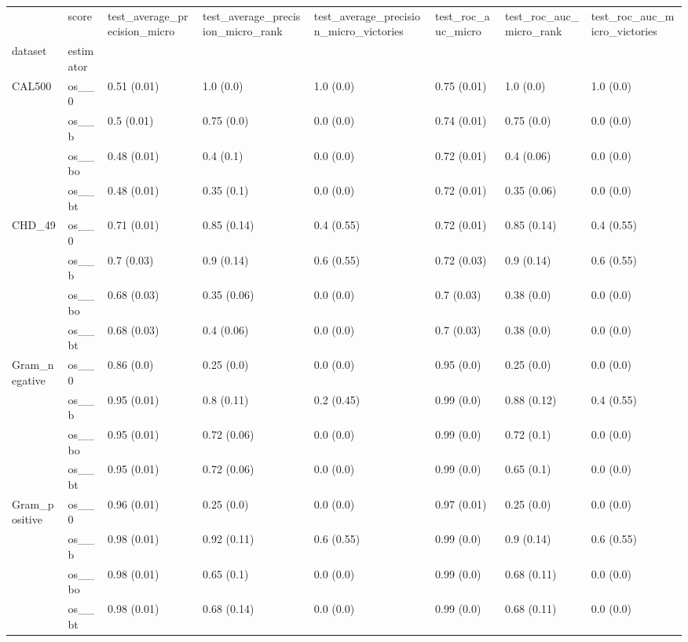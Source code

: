 \begin{tabular}{llllllll}
\toprule
 & score & test_average_precision_micro & test_average_precision_micro_rank & test_average_precision_micro_victories & test_roc_auc_micro & test_roc_auc_micro_rank & test_roc_auc_micro_victories \\
dataset & estimator &  &  &  &  &  &  \\
\midrule
\multirow[t]{4}{*}{CAL500} & os__0 & 0.51 (0.01) & 1.0 (0.0) & 1.0 (0.0) & 0.75 (0.01) & 1.0 (0.0) & 1.0 (0.0) \\
 & os__b & 0.5 (0.01) & 0.75 (0.0) & 0.0 (0.0) & 0.74 (0.01) & 0.75 (0.0) & 0.0 (0.0) \\
 & os__bo & 0.48 (0.01) & 0.4 (0.1) & 0.0 (0.0) & 0.72 (0.01) & 0.4 (0.06) & 0.0 (0.0) \\
 & os__bt & 0.48 (0.01) & 0.35 (0.1) & 0.0 (0.0) & 0.72 (0.01) & 0.35 (0.06) & 0.0 (0.0) \\
\cline{1-8}
\multirow[t]{4}{*}{CHD_49} & os__0 & 0.71 (0.01) & 0.85 (0.14) & 0.4 (0.55) & 0.72 (0.01) & 0.85 (0.14) & 0.4 (0.55) \\
 & os__b & 0.7 (0.03) & 0.9 (0.14) & 0.6 (0.55) & 0.72 (0.03) & 0.9 (0.14) & 0.6 (0.55) \\
 & os__bo & 0.68 (0.03) & 0.35 (0.06) & 0.0 (0.0) & 0.7 (0.03) & 0.38 (0.0) & 0.0 (0.0) \\
 & os__bt & 0.68 (0.03) & 0.4 (0.06) & 0.0 (0.0) & 0.7 (0.03) & 0.38 (0.0) & 0.0 (0.0) \\
\cline{1-8}
\multirow[t]{4}{*}{Gram_negative} & os__0 & 0.86 (0.0) & 0.25 (0.0) & 0.0 (0.0) & 0.95 (0.0) & 0.25 (0.0) & 0.0 (0.0) \\
 & os__b & 0.95 (0.01) & 0.8 (0.11) & 0.2 (0.45) & 0.99 (0.0) & 0.88 (0.12) & 0.4 (0.55) \\
 & os__bo & 0.95 (0.01) & 0.72 (0.06) & 0.0 (0.0) & 0.99 (0.0) & 0.72 (0.1) & 0.0 (0.0) \\
 & os__bt & 0.95 (0.01) & 0.72 (0.06) & 0.0 (0.0) & 0.99 (0.0) & 0.65 (0.1) & 0.0 (0.0) \\
\cline{1-8}
\multirow[t]{4}{*}{Gram_positive} & os__0 & 0.96 (0.01) & 0.25 (0.0) & 0.0 (0.0) & 0.97 (0.01) & 0.25 (0.0) & 0.0 (0.0) \\
 & os__b & 0.98 (0.01) & 0.92 (0.11) & 0.6 (0.55) & 0.99 (0.0) & 0.9 (0.14) & 0.6 (0.55) \\
 & os__bo & 0.98 (0.01) & 0.65 (0.1) & 0.0 (0.0) & 0.99 (0.0) & 0.68 (0.11) & 0.0 (0.0) \\
 & os__bt & 0.98 (0.01) & 0.68 (0.14) & 0.0 (0.0) & 0.99 (0.0) & 0.68 (0.11) & 0.0 (0.0) \\

\end{tabular}
